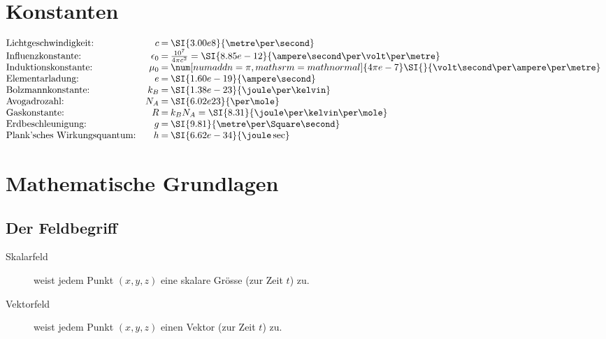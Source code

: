 
\section{Konstanten} %
	{
		\setlength{\mathindent}{0pt}
		\begin{equation*}
			\begin{array}{@{}l@{\quad}r@{\:=\:}l}
				\text{Lichtgeschwindigkeit:} & c & \SI{3.00e8}{\metre\per\second} \\
				\text{Influenzkonstante:} & \epsilon_0 & \frac{10^7}{4\pi c^2} = \SI{8.85e-12}{\ampere\second\per\volt\per\metre} \\
				\text{Induktionskonstante:} & \mu_0 & \num[numaddn=\pi,mathsrm=mathnormal]{4\pi e-7}\SI{}{\volt\second\per\ampere\per\metre} \\
				\text{Elementarladung:} & e & \SI{1.60e-19}{\ampere\second} \\
				\text{Bolzmannkonstante:} & k_B & \SI{1.38e-23}{\joule\per\kelvin} \\
				\text{Avogadrozahl:} & N_A & \SI{6.02e23}{\per\mole} \\
				\text{Gaskonstante:} & R & k_B N_A = \SI{8.31}{\joule\per\kelvin\per\mole} \\
				\text{Erdbeschleunigung:} & g & \SI{9.81}{\metre\per\Square\second} \\
				\text{Plank'sches Wirkungsquantum:} & h & \SI{6.62e-34}{\joule\sec}
			\end{array}
		\end{equation*}
	}

\section{Mathematische Grundlagen} %
	
	\subsection{Der Feldbegriff} %
		
		\begin{description}
			
			\item[Skalarfeld]
			weist jedem Punkt $(x,y,z)$ eine skalare Grösse (zur Zeit $t$) zu.
			
			\item[Vektorfeld]
			weist jedem Punkt $(x,y,z)$ einen Vektor (zur Zeit $t$) zu.
			
		\end{description}
		
